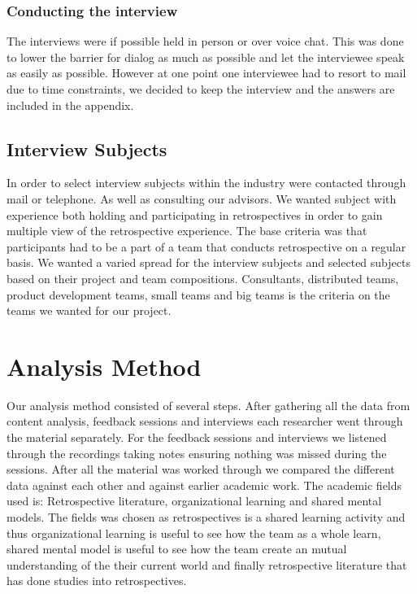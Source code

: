 \subsubsection{Conducting the interview}
The interviews were if possible held in person or over voice chat. This was done to lower the barrier for dialog as much as possible and let the interviewee speak as easily as possible. However at one point one interviewee had to resort to mail due to time constraints, we decided to keep the interview and the answers are included in the appendix. 

\subsection{Interview Subjects }
\label{subsec:Interview-Subjects}
In order to select interview subjects within the industry were contacted through mail or telephone. As well as consulting our advisors. We wanted subject with experience both holding and participating in retrospectives in order to gain multiple view of the retrospective experience. The base criteria was that participants had to be a part of a team that conducts retrospective on a regular basis. We wanted a varied spread for the interview subjects and selected subjects based on their project and team compositions. Consultants, distributed teams, product development teams, small teams and big teams is the criteria on the teams we wanted for our project.

\section{Analysis Method}
Our analysis method consisted of several steps. After gathering all the data from content analysis, feedback sessions and interviews each researcher went through the material separately. For the feedback sessions and interviews we listened through the recordings taking notes ensuring nothing was missed during the sessions. After all the material was worked through we compared the different data against each other and against earlier academic work. The academic fields used is: Retrospective literature, organizational learning and shared mental models. The fields was chosen as retrospectives is a shared learning activity and thus organizational learning is useful to see how the team as a whole learn, shared mental model is useful to see how the team create an mutual understanding of the their current world and finally retrospective literature that has done studies into retrospectives. 

